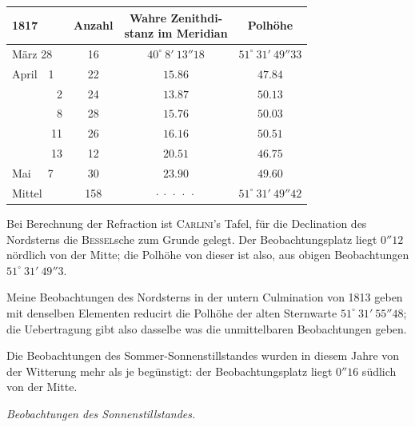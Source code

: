\begin{center}\fontsize{10}{12}\selectfont\setlength{\tabcolsep}{3pt}
\begin{tabular}{l|c|c|c}
1817 & Anzahl & \shortstack{Wahre Zenithdi-\\stanz im Meridian} & Polhöhe \\
\hline
März 28 & 16 & $40^\circ\ 8'\ 13''18$ & $51^\circ\ 31'\ 49''33$ \\
April\ \ 1 & 22 & $15.86$ & $47.84$ \\
\ \ \ \ \ \ \ \ 2 & 24 & $13.87$ & $50.13$ \\
\ \ \ \ \ \ \ \ 8 & 28 & $15.76$ & $50.03$ \\
\ \ \ \ \ \ \ 11 & 26 & $16.16$ & $50.51$ \\
\ \ \ \ \ \ \ 13 & 12 & $20.51$ & $46.75$ \\
Mai\ \ \ 7 & 30 & $23.90$ & $49.60$ \\
Mittel & 158 & $\cdot\ \cdot\ \cdot\ \cdot\ \cdot$ & $51^\circ\ 31'\ 49''42$ \\
\end{tabular}
\end{center}

\par\indent Bei Berechnung der Refraction ist \textsc{Carlini}'s Tafel, für die Declination des Nordsterns die
\textsc{Bessel}sche zum Grunde gelegt. Der Beobachtungsplatz liegt $0''12$ nördlich von der Mitte; die
Polhöhe von dieser ist also, aus obigen Beobachtungen $51^\circ\ 31'\ 49''3$.

\par\indent Meine Beobachtungen des Nordsterns in der untern Culmination von 1813 geben mit denselben
Elementen reducirt die Polhöhe der alten Sternwarte $51^\circ\ 31'\ 55''48$; die Uebertragung
gibt also dasselbe was die unmittelbaren Beobachtungen geben.

\par\indent Die Beobachtungen des Sommer-Sonnenstillstandes wurden in diesem Jahre von der Witterung mehr
als je begünstigt: der Beobachtungsplatz liegt $0''16$ südlich von der Mitte.

\par\indent\emph{Beobachtungen des Sonnenstillstandes.}


